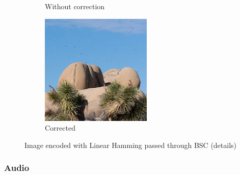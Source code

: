 \documentclass{article}
\begin{document}
\begin{figure}[htb]
\begin{subfigure}[b]{0.32\textwidth}
        \caption{Without correction}
        \label{fig:cropped-image-linear-bsc-no-correction}
    \end{subfigure}
    \hfill
    \begin{subfigure}[b]{0.32\textwidth}
        \centering
        \includegraphics[width=\textwidth]{../Result/cropped-linear-bsc-output-syndrome-corrected.png}
        \caption{Corrected}
        \label{fig:cropped-image-linear-bsc-syndrome-corrected}
    \end{subfigure}
       \caption{Image encoded with Linear Hamming passed through BSC (details)}
       \label{fig:cropped-image-linear-bsc}
\end{figure}


\subsubsection{Audio}
\end{document}
